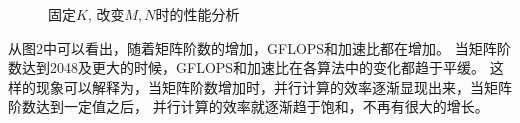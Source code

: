 \documentclass[UTF8]{article}
\begin{document}
\begin{figure}[htbp]
    \centering
    \centering
    \caption{固定$K$, 改变$M, N$时的性能分析}
    \end{figure}


从图2中可以看出，随着矩阵阶数的增加，GFLOPS和加速比都在增加。
当矩阵阶数达到2048及更大的时候，GFLOPS和加速比在各算法中的变化都趋于平缓。
这样的现象可以解释为，当矩阵阶数增加时，并行计算的效率逐渐显现出来，当矩阵阶数达到一定值之后，
并行计算的效率就逐渐趋于饱和，不再有很大的增长。
\end{document}
